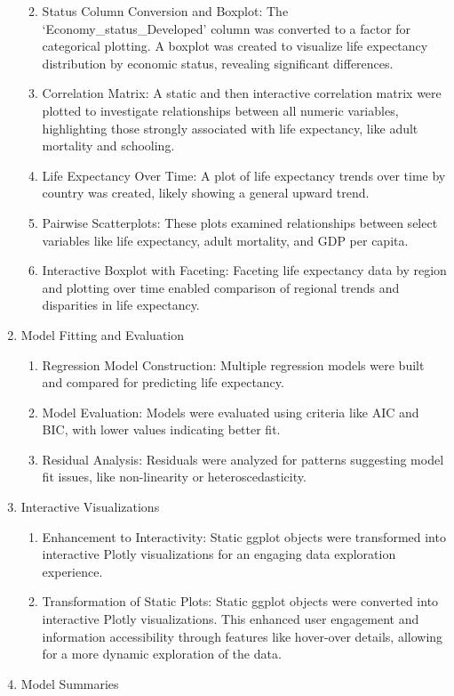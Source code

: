 \documentclass[
]{article}
\providecommand{\tightlist}{%
  \setlength{\itemsep}{0pt}\setlength{\parskip}{0pt}}
\begin{document}
\begin{enumerate}
  \begin{enumerate}
  \def\labelenumii{\alph{enumii}.}
  \tightlist
  \item
    Status Column Conversion and Boxplot: The
    `Economy\_status\_Developed' column was converted to a factor for
    categorical plotting. A boxplot was created to visualize life
    expectancy distribution by economic status, revealing significant
    differences.
  \item
    Correlation Matrix: A static and then interactive correlation matrix
    were plotted to investigate relationships between all numeric
    variables, highlighting those strongly associated with life
    expectancy, like adult mortality and schooling.
  \item
    Life Expectancy Over Time: A plot of life expectancy trends over
    time by country was created, likely showing a general upward trend.
  \item
    Pairwise Scatterplots: These plots examined relationships between
    select variables like life expectancy, adult mortality, and GDP per
    capita.
  \item
    Interactive Boxplot with Faceting: Faceting life expectancy data by
    region and plotting over time enabled comparison of regional trends
    and disparities in life expectancy.
  \end{enumerate}
\item
  Model Fitting and Evaluation

  \begin{enumerate}
  \def\labelenumii{\alph{enumii}.}
  \tightlist
  \item
    Regression Model Construction: Multiple regression models were built
    and compared for predicting life expectancy.
  \item
    Model Evaluation: Models were evaluated using criteria like AIC and
    BIC, with lower values indicating better fit.
  \item
    Residual Analysis: Residuals were analyzed for patterns suggesting
    model fit issues, like non-linearity or heteroscedasticity.
  \end{enumerate}
\item
  Interactive Visualizations

  \begin{enumerate}
  \def\labelenumii{\alph{enumii}.}
  \tightlist
  \item
    Enhancement to Interactivity: Static ggplot objects were transformed
    into interactive Plotly visualizations for an engaging data
    exploration experience.
  \item
    Transformation of Static Plots: Static ggplot objects were converted
    into interactive Plotly visualizations. This enhanced user
    engagement and information accessibility through features like
    hover-over details, allowing for a more dynamic exploration of the
    data.
  \end{enumerate}
\item
  Model Summaries


\end{enumerate}
\end{document}
